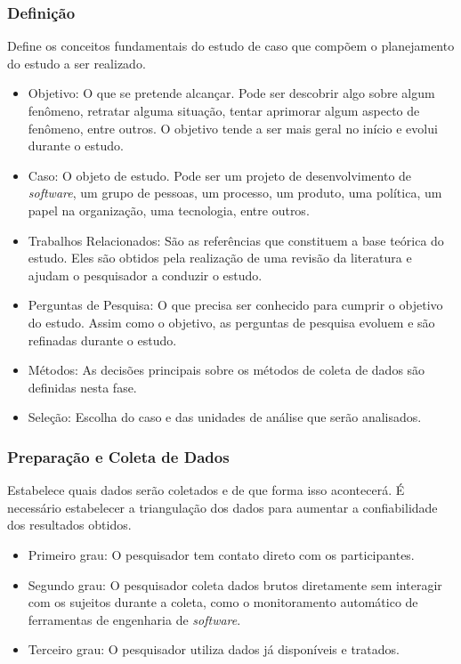 \subsubsection{Definição}

Define os conceitos fundamentais do estudo de caso que compõem o planejamento do estudo a ser realizado.

\begin{itemize}
    \item Objetivo: O que se pretende alcançar. Pode ser descobrir algo sobre algum fenômeno, retratar alguma situação, tentar aprimorar algum aspecto de fenômeno, entre outros. O objetivo tende a ser mais geral no início e evolui durante o estudo.
    \item Caso: O objeto de estudo. Pode ser um projeto de desenvolvimento de \textit{software}, um grupo de pessoas, um processo, um produto, uma política, um papel na organização, uma tecnologia, entre outros.
    \item Trabalhos Relacionados: São as referências que constituem a base teórica do estudo. Eles são obtidos pela realização de uma revisão da literatura e ajudam o pesquisador a conduzir o estudo.
    \item Perguntas de Pesquisa: O que precisa ser conhecido para cumprir o objetivo do estudo. Assim como o objetivo, as perguntas de pesquisa evoluem e são refinadas durante o estudo.
    \item Métodos: As decisões principais sobre os métodos de coleta de dados são definidas nesta fase.
    \item Seleção: Escolha do caso e das unidades de análise que serão analisados. 
  \end{itemize}


\subsubsection{Preparação e Coleta de Dados}

  Estabelece quais dados serão coletados e de que forma isso acontecerá. É necessário estabelecer a triangulação dos dados para aumentar a confiabilidade dos resultados obtidos.

  \begin{itemize}
    \item Primeiro grau: O pesquisador tem contato direto com os participantes. 
    \item Segundo grau: O pesquisador coleta dados brutos diretamente sem interagir com os sujeitos durante a coleta, como o monitoramento automático de ferramentas de engenharia de \textit{software}.
    \item Terceiro grau: O pesquisador utiliza dados já disponíveis e tratados.
  \end{itemize}


